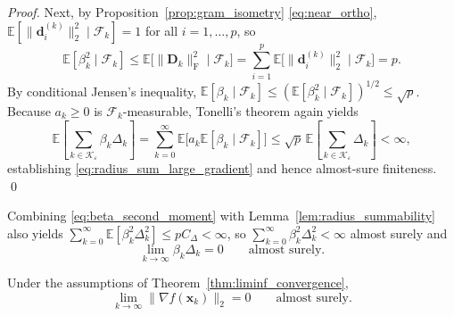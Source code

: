 \documentclass[smallextended]{svjour3}
\newcommand{\bx}{\bm{x}}
\newcommand{\bd}{\bm{d}}
\begin{document}
\begin{proof}
Next, by Proposition~\ref{prop:gram_isometry} \eqref{eq:near_ortho}, $\mathbb E[\|\bd_i^{(k)}\|_2^2 \mid \mathcal F_k] = 1$ for all $i=1,\ldots,p$, so
\begin{equation}
\label{eq:beta_second_moment}
\mathbb E[\beta_k^2\mid\mathcal F_k] \le \mathbb E\bigl[\|\bm D_k\|_{\mathrm{F}}^2 \;\big|\; \mathcal F_k\bigr] = \sum_{i=1}^p \mathbb E\bigl[\|\bd_i^{(k)}\|_2^2 \;\big|\; \mathcal F_k\bigr] = p.
\end{equation}
By conditional Jensen's inequality, $\mathbb E[\beta_k\mid\mathcal F_k] \le (\mathbb E[\beta_k^2\mid\mathcal F_k])^{1/2} \le \sqrt p$. Because $a_k \ge 0$ is $\mathcal F_k$-measurable, Tonelli's theorem again yields
\[
\mathbb E\left[\sum_{k\in\mathcal K_\varepsilon}\beta_k\Delta_k\right] = \sum_{k=0}^{\infty} \mathbb E\bigl[a_k \mathbb E[\beta_k\mid\mathcal F_k]\bigr] \le \sqrt p\,\mathbb E\left[\sum_{k\in\mathcal K_\varepsilon}\Delta_k\right] < \infty,
\]
establishing \eqref{eq:radius_sum_large_gradient} and hence almost-sure finiteness.
\qed
\end{proof}

Combining \eqref{eq:beta_second_moment} with Lemma~\ref{lem:radius_summability} also yields $\sum_{k=0}^{\infty} \mathbb E[\beta_k^2 \Delta_k^2] \le p C_\Delta < \infty$, so $\sum_{k=0}^{\infty} \beta_k^2 \Delta_k^2 < \infty$ almost surely and
\begin{equation}
\label{eq:actual_step_decay}
\lim_{k\to\infty} \beta_k\Delta_k = 0 \qquad \text{almost surely}.
\end{equation}

\begin{theorem}
\label{thm:global_convergence}
Under the assumptions of Theorem~\ref{thm:liminf_convergence},
\begin{equation}
\label{eq:gradient_convergence}
\lim_{k\to\infty} \|\nabla f(\bx_k)\|_2 = 0 \qquad \text{almost surely}.
\end{equation}
\end{theorem}
\end{document}
